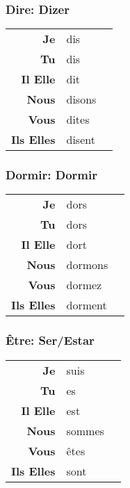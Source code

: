 \documentclass{subfiles}
\begin{document}
\begin{multicols}{3}
        \subsubsection{Dire: Dizer}
            \begin{tabular}{r l r}
                \textbf{Je}        & dis    &\\
                \textbf{Tu}        & dis    &\\
                \textbf{Il Elle}   & dit    &\\
                \textbf{Nous}      & disons &\\
                \textbf{Vous}      & dites  &\\
                \textbf{Ils Elles} & disent &
            \end{tabular}

        \subsubsection{Dormir: Dormir}
            \begin{tabular}{r l r}
                \textbf{Je}        & dors    &\\
                \textbf{Tu}        & dors    &\\
                \textbf{Il Elle}   & dort    &\\
                \textbf{Nous}      & dormons &\\
                \textbf{Vous}      & dormez  &\\
                \textbf{Ils Elles} & dorment &
            \end{tabular}

        \subsubsection{Être: Ser/Estar}
            \begin{tabular}{r l r}
                \textbf{Je}        & suis   &\\
                \textbf{Tu}        & es     &\\
                \textbf{Il Elle}   & est    &\\
                \textbf{Nous}      & sommes &\\
                \textbf{Vous}      & êtes   &\\
                \textbf{Ils Elles} & sont   &
            \end{tabular}


\end{multicols}
\end{document}
